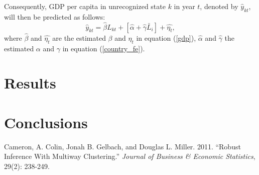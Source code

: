 \documentclass[12pt,a4paper]{article}%
\begin{document}
Consequently, GDP per capita in unrecognized state $k$ in year $t$, denoted by $\hat{y}_{kt}$, will then be predicted as follows:
\begin{equation}
\hat{y}_{kt} = \hat{\beta} L_{kt} + [\hat{\alpha} + \hat{\gamma} \bar{L}_{i}]  + \hat{\eta_t},
\end{equation}
where $\hat{\beta}$ and $\hat{\eta_t}$ are the estimated $\beta$ and $\eta_t$ in equation (\ref{gdp}), $\hat{\alpha}$ and $\hat{\gamma}$ the estimated $\alpha$ and $\gamma$ in equation (\ref{country_fe}).

\section{Results}
\section{Conclusions}


\begin{thebibliography}{99}                                                                                                %
\bibitem{} Cameron, A. Colin, Jonah B. Gelbach, and Douglas L. Miller. 2011. ``Robust Inference With Multiway Clustering.'' \textit{Journal of Business \& Economic Statistics}, 29(2): 238-249.	
\end{thebibliography}
\end{document}
